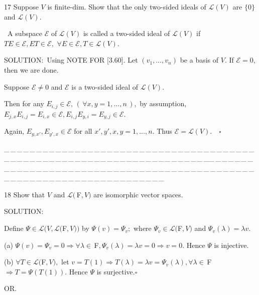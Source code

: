 \documentclass[a4paper, 11pt, UTF8]{article}
\def\Lm{\mathcal{L}}
\def\Fbfc{$\,{\timesbf F}$}
\begin{document}
\begin{large}
{\timesbf\Large 17} {\timessl\Large Suppose $V$ is finite-dim. Show that the only two-sided ideals of $\Lm(V)$ are $\{0\}$ and $\Lm(V)$.}\par\quad\,
{\timessl A subspace $\mathcal{E}$ of $\Lm(V)$ is called a two-sided ideal of $\Lm(V)$ if $TE\in\mathcal{E},ET\in\mathcal{E},\,\,\forall E\in\mathcal{E},T\in\Lm(V)$.
}\par
{\timesbf S\footnotesize{OLUTION:}}\,\,\,Using N{\small OTE} F{\small OR} [3.60]. Let $(v_1,\dots,v_n)$ be a basis of $V$. If $\mathcal{E}=0$, then we are done.\par\quad Suppose $\mathcal{E}\neq 0$ and $\mathcal{E}$ is a two-sided ideal of $\Lm(V)$.\par\quad
Then for any $E_{i,j}\in\mathcal{E},\,(\,\forall x,y=1,\dots,n\,),$ by assumption, $E_{j,x}E_{i,j}=E_{i,x}\in\mathcal{E},E_{i,j}E_{y,i}=E_{y,j}\in\mathcal{E}.$\par\quad
Again, $E_{y,x'},E_{y',x}\in\mathcal{E}$ for all $x',y',x,y=1,\dots,n.$ Thus $\mathcal{E}=\Lm(V).\quad\square$\par
{\tiny \_\,\_\,\_\,\_\,\_\,\_\,\_\,\_\,\_\,\_\,\_\,\_\,\_\,\_\,\_\,\_\,\_\,\_\,\_\,\_\,\_\,\_\,\_\,\_\,\_\,\_\,\_\,\_\,\_\,\_\,\_\,\_\,\_\,\_\,\_\,\_\,\_\,\_\,\_\,\_\,\_\,\_\,\_\,\_\,\_\,\_\,\_\,\_\,\_\,\_\,\_\,\_\,\_\,\_\,\_\,\_\,\_\,\_\,\_\,\_\,\_\,\_\,\_\,\_\,\_\,\_\,\_\,\_\,\_\,\_\,\_\_\,\_\,\_\,\_\,\_\,\_\,\_\,\_\,\_\,\_\,\_\,\_\,\_\,\_\,\_\,\_\,\_\,\_\,\_\,\_\,\_\,\_\,\_\,\_\,\_\,\_\,\_\,\_\,\_\,\_\,\_\,\_\,\_\,\_\,\_\,\_\,\_\,\_\,\_\,\_\,\_\,\_\,\_\,\_\,\_\,\_\,\_\,\_\,\_\,\_\,\_\,\_\,\_\,\_\,\_\,\_\,\_\,\_\,\_\,\_\,\_\,\_\,\_\,\_\,\_\,\_\,\_\,\_\,\_\,\_\,\_}\par
{\timesbf\Large 18} {\timessl\Large 
Show that $V$ and $\Lm(\Fbfc, V)$ are isomorphic vector spaces.}\par
{\timesbf S\footnotesize{OLUTION:}}\par\quad
Define $\Psi\in\Lm(V,\Lm(${\timesbf F}$, V))$ by $\Psi(v)=\Psi_v;$ where $\Psi_v\in\Lm(${\timesbf F}$, V)$ and $\Psi_v(\lambda)=\lambda v.$\par\quad
(a) $\Psi(v)=\Psi_v=0\Rightarrow \forall \lambda\in\Fbfc,\Psi_v(\lambda)=\lambda v=0\Rightarrow v=0.$ Hence $\Psi$ is injective.\par\quad
(b) $\forall T\in\Lm(${\timesbf F}$,V),$ let $v= T(1)\Rightarrow T(\lambda)=\lambda v=\Psi_v(\lambda),\forall\lambda\in\Fbfc\Rightarrow T=\Psi( T(1)).$ Hence $\Psi$ is surjective.$\square$\par\quad
O{\small R.}\par\quad

\end{large}
\end{document}
